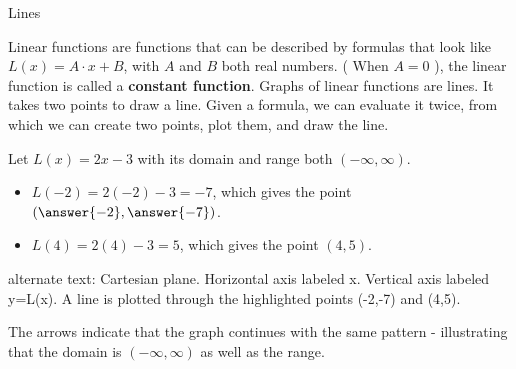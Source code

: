 \documentclass{ximera}
\begin{document}
\begin{example} Lines

Linear functions are functions that can be described by formulas that look like $L(x) = A \cdot x + B$, with $A$ and $B$ both real numbers. ( When $A = 0$ ), the linear function is called a \textbf{constant function}.   Graphs of linear functions are lines.  It takes two points to draw a line. Given a formula, we can evaluate it twice, from which we can create two points, plot them, and draw the line.

Let $L(x) = 2x-3$ with its domain and range both $(-\infty, \infty)$.

\begin{itemize}
\item $L(-2) = 2(-2) - 3 = -7$, which gives the point $\left(\answer{-2}, \answer{-7}\right)$.
\item $L(4) = 2(4) - 3 = 5$, which gives the point $(4, 5)$.
\end{itemize}






\begin{image}
\end{image}

\textcolor{gray!90}{alternate text: Cartesian plane. Horizontal axis labeled x. Vertical axis labeled y=L(x).  A line is plotted through the highlighted points (-2,-7) and (4,5).}




The arrows indicate that the graph continues with the same pattern - illustrating that the domain is $(-\infty, \infty)$ as well as the range.






\end{example}
\end{document}
